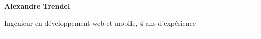 \documentclass{cv}
\begin{document}
\pagestyle{empty}

\noindent\begin{minipage}[c]{.65\textwidth}
	\large
	\textbf{Alexandre Trendel}

	Ingénieur en développement web et mobile, 4 ans d'expérience

	\color{solred}\rule{2cm}{1pt}

\end{minipage}
\hfill
\begin{minipage}[c]{0.28\textwidth}%

	\centering

\end{minipage}

\vspace{1cm}
\end{document}
